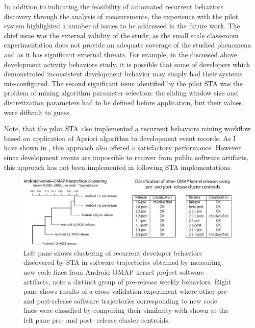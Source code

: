 In addition to indicating the feasibility of automated recurrent behaviors discovery through the analysis of measurements, 
the experience with the pilot system highlighted a number of issues to be addressed in the future work.
The chief issue was the external validity of the study, as the small scale class-room experimentation does not provide an 
adequate coverage of the studied phenomena and as it has significant external threats. 
For example, in the discussed above development activity behaviors study, it is possible that some of developers 
which demonstrated inconsistent development behavior may simply had their systems mis-configured.
The second significant issue identified by the pilot STA was the problem of mining algorithm parameter selection:
the sliding window size and discretization parameters had to be defined before application, but their values were difficult 
to guess.

Note, that the pilot STA also implemented a recurrent behaviors mining workflow based on application of Apriori algorithm 
\cite{citeulike:775528} to development event records. As I have shown in \cite{citeulike:13159603}, this approach also
offered a satisfactory performance. However, since development events are impossible to recover from public software 
artifacts, this approach has not been implemented in following STA implementations.

\begin{figure}[t]
   \centering
   \includegraphics[width=145mm]{figures/STA2-draft.eps}
   \caption{
   Left pane shows clustering of recurrent developer behaviors discovered by STA in software trajectories obtained by 
   measuring new code lines from Android OMAP kernel project software artifacts, note a distinct group of pre-release weekly 
   behaviors.  
   Right pane shows results of a cross-validation experiment where other pre- and post-release software trajectories 
   corresponding to new code lines were classified by computing their similarity with shown at the left pane pre- and 
   post- release  cluster centroids.}
   \label{fig:STA2-results}
\end{figure}

